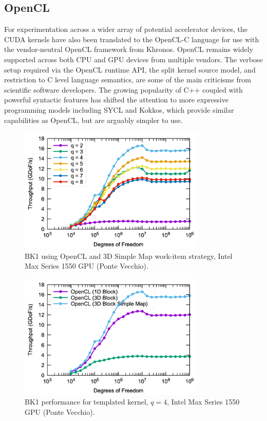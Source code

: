 \documentclass[a4paper,12pt]{article}
\begin{document}
\subsection{OpenCL}

For experimentation across a wider array of potential accelerator devices, the CUDA kernels have also been translated to the OpenCL-C language for use with the vendor-neutral OpenCL framework from Khronos.
OpenCL remains widely supported across both CPU and GPU devices from multiple vendors.
The verbose setup required via the OpenCL runtime API, the split kernel source model, and restriction to C level language semantics, are some of the main criticisms from scientific software developers. 
The growing popularity of C++ coupled with powerful syntactic features has shifted the attention to more expressive programming models including SYCL and Kokkos, which provide similar capabilities as OpenCL, but are arguably simpler to use. 

\begin{figure}[htbp]
  \centering
  \includegraphics[width=0.8\textwidth]{pvc_opencl} %
  \caption{BK1 using OpenCL and 3D Simple Map work-item strategy, Intel Max Series 1550 GPU (Ponte Vecchio).}
  \label{fig:pvc_opencl}
\end{figure}

\begin{figure}[htbp]
  \centering
  \includegraphics[width=0.8\textwidth]{pvc_opencl_q4_static} %
  \caption{BK1 performance for templated kernel, $q = 4$, Intel Max Series 1550 GPU (Ponte Vecchio).}
  \label{fig:pvc_static}
\end{figure}
\end{document}
